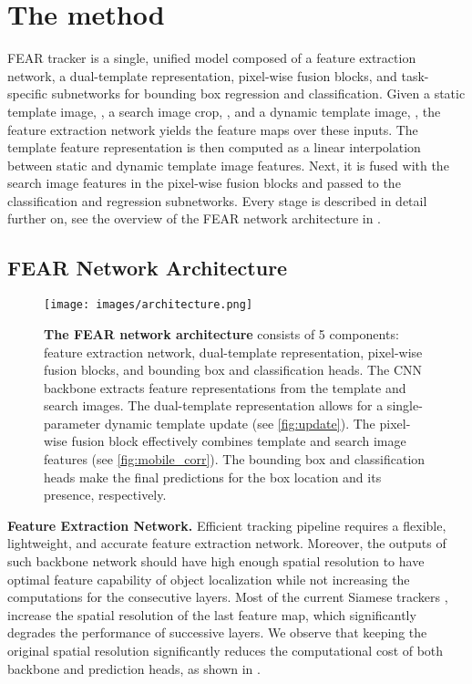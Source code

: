 \documentclass[runningheads]{llncs}
\begin{document}
\section{The method}

FEAR tracker is a single, unified model composed of a feature extraction network, a dual-template representation, pixel-wise fusion blocks, and task-specific subnetworks for bounding box regression and classification. 
Given a static template image, , a search image crop, , and a dynamic template image, , the feature extraction network yields the feature maps over these inputs.
The template feature representation is then computed as a linear interpolation between static and dynamic template image features. 
Next, it is fused with the search image features in the pixel-wise fusion blocks and passed to the classification and regression subnetworks. 
Every stage is described in detail further on, see the overview of the FEAR network architecture in .

\subsection{FEAR Network Architecture}



\begin{figure*}[t!]\texttt{[image: images/architecture.png]}
\caption{\textbf{The FEAR network architecture} consists of 5 components: feature extraction network, dual-template representation, pixel-wise fusion blocks, and bounding box and classification heads. 
  The CNN backbone extracts feature representations from the template and search images. 
  The dual-template representation allows for a single-parameter dynamic template update (see \cref{fig:update}).
  The pixel-wise fusion block effectively combines template and search image features (see \cref{fig:mobile_corr}). 
  The bounding box and classification heads make the final predictions for the box location and its presence, respectively.}
\label{fig:arch}
\end{figure*}

\textbf{Feature Extraction Network.} Efficient tracking pipeline requires a flexible, lightweight, and accurate feature extraction network. 
Moreover, the outputs of such backbone network should have high enough spatial resolution to have optimal feature capability of object localization \cite{SiamRPN++} while not increasing the computations for the consecutive layers. 
Most of the current Siamese trackers \cite{Ocean}, \cite{SiamRPN++} increase the spatial resolution of the last feature map, which significantly degrades the performance of successive layers. 
We observe that keeping the original spatial resolution significantly reduces the computational cost of both backbone and prediction heads, as shown in .
\end{document}
